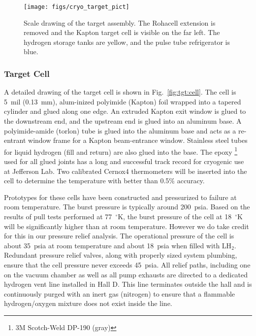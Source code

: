 \begin{figure}[h]
\begin{center}
      \texttt{[image: figs/cryo\_target\_pict]}
\end{center}
\caption{
Scale drawing of the target assembly.  The Rohacell extension is
removed and the Kapton target cell is visible on the far left.  The
hydrogen storage tanks are yellow, and the pulse tube refrigerator is
blue.
\label{fig:tgt:pict}}
\end{figure}


\subsubsection[Target Cell]{Target Cell \label{sec:tgt:cell}}

A detailed drawing of the target cell is shown in
Fig.~\ref{fig:tgt:cell}.  The cell is 5~mil (0.13~mm), alum-inized
polyimide (Kapton) foil wrapped into a tapered cylinder and glued
along one edge.  An extruded Kapton exit window is glued to the
downstream end, and the upstream end is glued into an aluminum base.
A polyimide-amide (torlon) tube is glued into the aluminum base and
acts as a re-entrant window frame for a Kapton beam-entrance window.
Stainless steel tubes for liquid hydrogen (fill and return) are also
glued into the base.  The epoxy%
\footnote{3M Scotch-Weld DP-190 (gray)}
used for all
glued joints has a long and successful track record for cryogenic use
at Jefferson Lab.  Two calibrated Cernox4 thermometers will be
inserted into the cell to determine the temperature with better than
0.5\% accuracy.

Prototypes for these cells have been constructed and pressurized to
failure at room temperature.  The burst pressure is typically around
200~psia. Based on the results of pull tests performed at 77~$^\circ$K, the
burst pressure of the cell at 18~$^\circ$K will be significantly higher than
at room temperature.  However we do take credit for this in our
pressure relief analysis.  The operational pressure of the cell is
about 35~psia at room temperature and about 18~psia when filled with
LH$_2$. Redundant pressure relief valves, along with properly sized
system plumbing, ensure that the cell pressure never exceeds 45~psia.
All relief paths, including one on the vacuum chamber as well as all
pump exhausts are directed to a dedicated hydrogen vent line installed
in Hall D.  This line terminates outside the hall and is continuously
purged with an inert gas (nitrogen) to ensure that a flammable
hydrogen/oxygen mixture does not exist inside the line.

